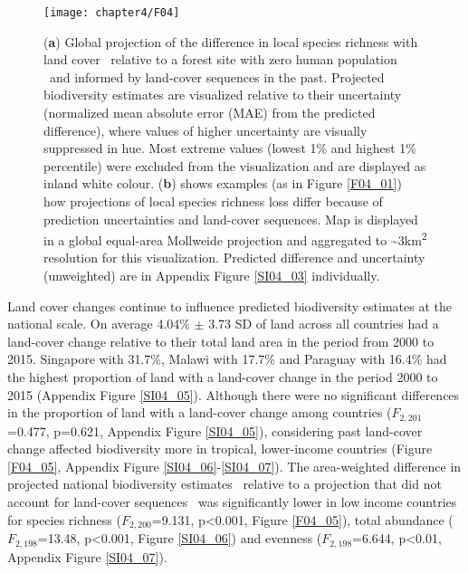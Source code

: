 \begin{figure}[!h]
\centering
\texttt{[image: chapter4/F04]}
\caption{ (\textbf{a}) Global projection of the difference in local species richness with land cover \textendash\ relative to a forest site with zero human population \textendash\ and informed by land-cover sequences in the past. Projected biodiversity estimates are visualized relative to their uncertainty (normalized mean absolute error (MAE) from the predicted difference), where values of higher uncertainty are visually suppressed in hue. Most extreme values (lowest 1\% and highest 1\% percentile) were excluded from the visualization and are displayed as inland white colour. (\textbf{b}) shows examples (as in Figure \ref{F04_01}) how projections of local species richness loss differ because of prediction uncertainties and land-cover sequences. Map is displayed in a global equal-area Mollweide projection and aggregated to \textasciitilde 3km\textsuperscript{2} resolution for this visualization. Predicted difference and uncertainty (unweighted) are in Appendix Figure \ref{SI04_03} individually. }
\label{F04_04}
\end{figure}

Land cover changes continue to influence predicted biodiversity estimates at the national scale. On average 4.04\% $\pm$ 3.73 SD of land across all countries had a land-cover change relative to their total land area in the period from 2000 to 2015. Singapore with 31.7\%, Malawi with 17.7\% and Paraguay with 16.4\% had the highest proportion of land with a land-cover change in the period 2000 to 2015 (Appendix Figure \ref{SI04_05}). Although there were no significant differences in the proportion of land with a land-cover change among countries ($F_{2,201}$=0.477, p=0.621, Appendix Figure \ref{SI04_05}), considering past land-cover change affected biodiversity more in tropical, lower-income countries (Figure \ref{F04_05}, Appendix Figure \ref{SI04_06}-\ref{SI04_07}). The area-weighted difference in projected national biodiversity estimates \textendash\ relative to a projection that did not account for land-cover sequences \textendash\ was significantly lower in low income countries for species richness ($F_{2,200}$=9.131, p<0.001, Figure \ref{F04_05}), total abundance ($F_{2,198}$=13.48, p<0.001, Figure \ref{SI04_06}) and evenness ($F_{2,198}$=6.644, p<0.01, Appendix Figure \ref{SI04_07}).

